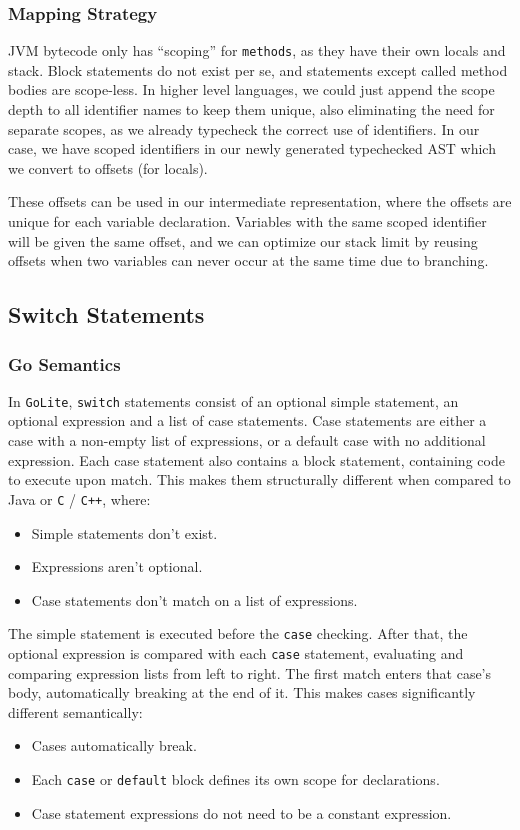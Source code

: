 \documentclass[11pt]{article}
\begin{document}
\subsubsection{Mapping Strategy}
\label{sec:orgfd3a48c}
JVM bytecode only has ``scoping'' for \texttt{methods}, as they have
their own locals and stack. Block statements do not exist per se, and
statements except called method bodies are scope-less. In higher
level languages, we could just append the scope depth to all
identifier names to keep them unique, also eliminating the
need for separate scopes, as we already typecheck the correct use of
identifiers. In our case, we have scoped identifiers in our newly
generated typechecked AST which we convert to offsets (for
locals).

These offsets can be used in our intermediate representation,
where the offsets are unique for each variable
declaration. Variables with the same scoped identifier will be
given the same offset, and we can optimize our stack limit by
reusing offsets when two variables can never occur at the same
time due to branching.
\subsection{Switch Statements}
\label{sec:orgd4cbf42}
\subsubsection{Go Semantics}
\label{sec:org468a8cf}
In \texttt{GoLite}, \texttt{switch} statements consist of an optional simple
statement, an optional expression and a list
of case statements. Case statements are either a case with a
non-empty list of expressions, or a default case with no additional expression.
Each case statement also contains a block statement, containing code to execute
upon match. This makes
them structurally different when compared to Java or \texttt{C} / \texttt{C++}, where:
\begin{itemize}[noitemsep]
\item Simple statements don't exist.
\item Expressions aren't optional.
\item Case statements don't match on a list of expressions.
\end{itemize}
The simple statement is executed before the \texttt{case} checking.
After that, the optional expression is compared with each \texttt{case}
statement, evaluating and comparing expression lists from left to
right. The first match enters that case's body, automatically
breaking at the end of it. This makes cases significantly different
semantically:
\begin{itemize}[noitemsep]
\item Cases automatically break.
\item Each \texttt{case} or \texttt{default} block defines its own scope for declarations.
\item Case statement expressions do not need to be a constant expression.
\end{itemize}
\end{document}
